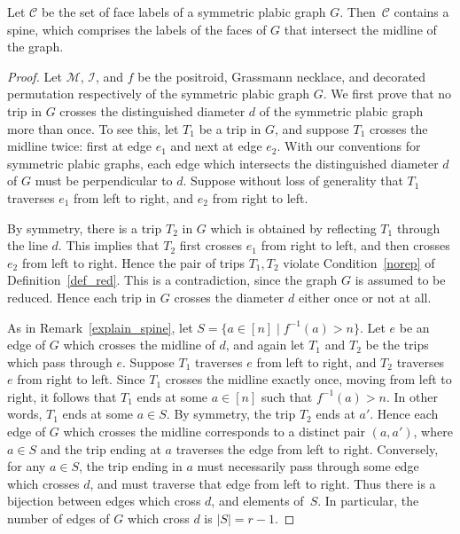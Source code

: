 \documentclass[ALCO,ThmDefs,Unicode,epreuves]{cedram}
\begin{document}
\begin{lemm}
\label{has_spine}
Let $\mathcal{C}$ be the set of face labels of a symmetric plabic graph $G$. Then~$\mathcal{C}$ contains a spine, which comprises the labels of the faces of $G$ that intersect the midline of the graph. 
\end{lemm}

\begin{proof}
Let $\mathcal{M}$, $\mathcal{I}$, and $f$ be the positroid, Grassmann necklace, and decorated permutation respectively of the symmetric plabic graph $G$. We first prove that no trip in $G$ crosses the distinguished diameter $d$ of the symmetric plabic graph more than once. To see this, let $T_1$ be a trip in $G$, and suppose $T_1$ crosses the midline twice: first at edge $e_1$ and next at edge $e_2$. With our conventions for symmetric plabic graphs, each edge which intersects the distinguished diameter $d$ of $G$ must be perpendicular to $d$. Suppose without loss of generality that $T_1$ traverses $e_1$ from left to right, and $e_2$ from right to left. 

By symmetry, there is a trip $T_2$ in $G$ which is obtained by reflecting $T_1$ through the line $d$. This implies that $T_2$ first crosses $e_1$ from right to left, and then crosses $e_2$ from left to right. Hence the pair of trips $T_1, T_2$ violate Condition~\eqref{norep} of Definition~\ref{def_red}. This is a contradiction, since the graph $G$ is assumed to be reduced. Hence each trip in $G$ crosses the diameter $d$ either once or not at all.

As in Remark~\ref{explain_spine}, let $S = \{a \in [n] \mid f^{-1}(a) > n\}$. Let $e$ be an edge of $G$ which crosses the midline of $d$, and again let $T_1$ and $T_2$ be the trips which pass through $e$. Suppose $T_1$ traverses $e$ from left to right, and $T_2$ traverses $e$ from right to left. Since $T_1$ crosses the midline exactly once, moving from left to right, it follows that $T_1$ ends at some $a \in [n]$ such that $f^{-1}(a) > n$. In other words, $T_1$ ends at some $a \in S$. By symmetry, the trip $T_2$ ends at $a'$. Hence each edge of $G$ which crosses the midline corresponds to a distinct pair $(a,a')$, where $a \in S$ and the trip ending at $a$ traverses the edge from left to right. Conversely, for any $a \in S$, the trip ending in $a$ must necessarily pass through some edge which crosses $d$, and must traverse that edge from left to right. Thus there is a bijection between edges which cross $d$, and elements of~$S$. In particular, the number of edges of $G$ which cross $d$ is $|S| = r - 1$.


\end{proof}
\end{document}

